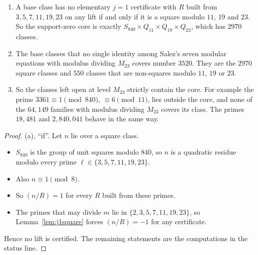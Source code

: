 \begin{theorem}\label{thm:termcore}
\begin{enumerate}[label=(\alph*)]
\item A base class has no elementary $j=1$ certificate with $R$ built from $3,5,7,11,19,23$ on any lift if and only if it is a square modulo $11$, $19$ and $23$. So the support-zero core is exactly $S_{840}\times Q_{11}\times Q_{19}\times Q_{23}$, which has $2970$ classes.
\item The base classes that no single identity among Salez's seven modular equations \cite{Salez} with modulus dividing $M_{23}$ covers number $3520$. They are the $2970$ square classes and $550$ classes that are non-squares modulo $11$, $19$ or $23$.
\item So the classes left open at level $M_{23}$ strictly contain the core. For example the prime $3361\equiv1\pmod{840}$, $\equiv6\pmod{11}$, lies outside the core, and none of the $64{,}149$ families with modulus dividing $M_{23}$ covers its class. The primes $18{,}481$ and $2{,}840{,}041$ behave in the same way.
\end{enumerate}
\end{theorem}
\begin{proof}
(a), ``if''. Let $n$ lie over a square class.
\begin{itemize}
\item $S_{840}$ is the group of unit squares modulo $840$, so $n$ is a quadratic residue modulo every prime $\ell\in\{3,5,7,11,19,23\}$.
\item Also $n\equiv1\pmod8$.
\item So $(n/R)=1$ for every $R$ built from these primes.
\item The primes that may divide $m$ lie in $\{2,3,5,7,11,19,23\}$, so Lemma~\ref{lem:j1square} forces $(n/R)=-1$ for any certificate.
\end{itemize}
Hence no lift is certified. The remaining statements are the computations in the status line.
\end{proof}

